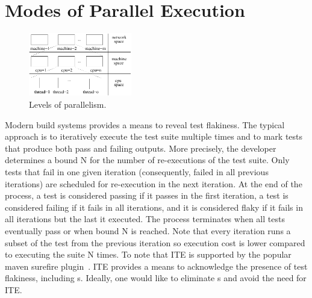 \section{Modes of Parallel Execution}

\begin{figure}[t]
  \centering
  \includegraphics[width=0.4\textwidth]{figs/parallel-levels.pdf}
  \caption{\label{fig:levels}Levels of parallelism.}
\end{figure}



Modern build systems provides a means to reveal test flakiness.  The
typical approach is to iteratively execute the test suite multiple
times and to mark tests that produce both pass and failing outputs.
More precisely, the developer determines a bound N for the number of
re-executions of the test suite.  Only tests that fail in one given
iteration (consequently, failed in all previous iterations) are
scheduled for re-execution in the next iteration.  At the end of the
process, a test is considered passing if it passes in the first
iteration, a test is considered failing if it fails in all iterations,
and it is considered flaky if it fails in all iterations but the last
it executed.  The process terminates when all tests eventually pass or
when bound N is reached.  Note that every iteration runs a subset of
the test from the previous iteration so execution cost is lower
compared to executing the suite N times.  To note that ITE is
supported by the popular maven surefire
plugin~\cite{maven-surefire-plugin}. ITE provides a means to acknowledge the presence
of test flakiness, including \pef{}s.  Ideally, one would like to
eliminate \pef{}s and avoid the need for ITE.
